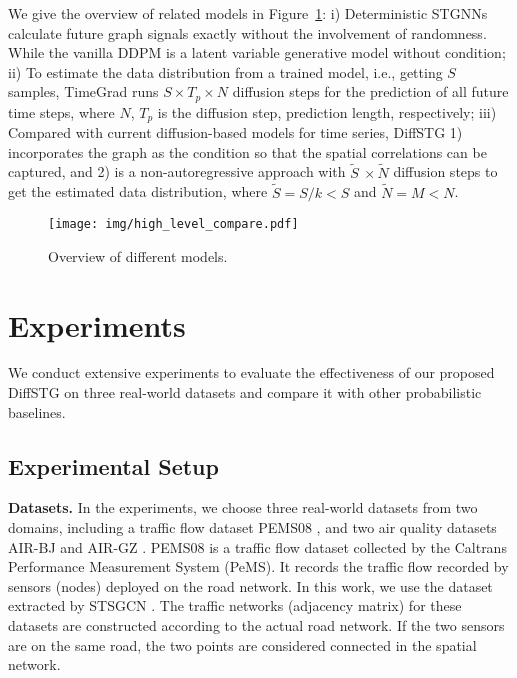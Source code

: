 {\par We give the overview of related models in Figure~\ref{fig:overview}: i) Deterministic STGNNs calculate future graph signals exactly without the involvement of randomness. While the vanilla DDPM is a latent variable generative model without condition; ii) To estimate the data distribution from a trained model, i.e., getting $S$ samples, TimeGrad runs $S \times T_p \times N $ diffusion steps for the prediction of all future time steps, where  $N$, $T_p$ is the diffusion step, prediction length, respectively; iii) Compared with current diffusion-based models for time series, DiffSTG 1) incorporates the graph as the condition so that the spatial correlations can be captured, and 2) is a non-autoregressive approach with $\widetilde{S}~\times \widetilde{N} $ diffusion steps to get the estimated data distribution, where $\widetilde{S}=S/k <S$ and $\widetilde{N}=M < N$.

\begin{figure}[t]
    \centering
    \texttt{[image: img/high\_level\_compare.pdf]} 
    \vspace{-1.5em}
    \caption{Overview of different models.}
    \label{fig:overview}
    \vspace{-15pt}
\end{figure}

\section{Experiments} \label{sec:experiment}

\par We conduct extensive experiments to evaluate the effectiveness of our proposed DiffSTG on three real-world datasets and compare it with other probabilistic baselines. 

\subsection{Experimental Setup}
\textbf{Datasets.} In the experiments, we choose three real-world datasets from two domains, including a traffic flow dataset PEMS08 \cite{STSGCN-2020}, and two air quality datasets AIR-BJ and AIR-GZ \cite{yi2018deep}.  PEMS08 is a traffic flow dataset collected by the Caltrans Performance Measurement System (PeMS). It records the traffic flow recorded by sensors (nodes) deployed on the road network. In this work, we use the dataset extracted by STSGCN \cite{STSGCN-2020}. The traffic networks (adjacency matrix) for these datasets are constructed according to the actual road network. If the two sensors are on the same road, the two points are considered connected in the spatial network. 

}
